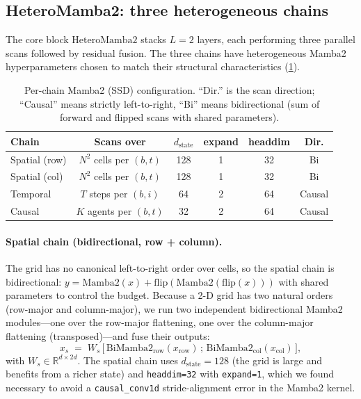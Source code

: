 \subsection{HeteroMamba2: three heterogeneous chains}
\label{sec:hetero}

The core block $\mathrm{HeteroMamba2}$ stacks $L=2$ layers, each performing
three parallel scans followed by residual fusion. The three chains have
heterogeneous Mamba2 hyperparameters chosen to match their structural
characteristics (\cref{tab:chains}).

\begin{table}[h]
\centering
\small
\caption{Per-chain Mamba2 (SSD) configuration. ``Dir.'' is the scan direction;
``Causal'' means strictly left-to-right, ``Bi'' means bidirectional (sum of
forward and flipped scans with shared parameters).}
\label{tab:chains}
\begin{tabular}{lccccc}
\toprule
Chain & Scans over & $d_{\text{state}}$ & expand & headdim & Dir. \\
\midrule
Spatial (row) & $N^2$ cells per $(b,t)$ & 128 & 1 & 32 & Bi \\
Spatial (col) & $N^2$ cells per $(b,t)$ & 128 & 1 & 32 & Bi \\
Temporal      & $T$ steps per $(b,i)$   & 64  & 2 & 64 & Causal \\
Causal        & $K$ agents per $(b,t)$  & 32  & 2 & 64 & Causal \\
\bottomrule
\end{tabular}
\end{table}

\paragraph{Spatial chain (bidirectional, row + column).}
The grid has no canonical left-to-right order over cells, so the spatial chain
is bidirectional: $y = \mathrm{Mamba2}(x) + \mathrm{flip}(\mathrm{Mamba2}(\mathrm{flip}(x)))$
with shared parameters to control the budget. Because a 2-D grid has two natural
orders (row-major and column-major), we run two independent bidirectional
Mamba2 modules---one over the row-major flattening, one over the column-major
flattening (transposed)---and fuse their outputs:
\begin{equation}
x_s \;=\; W_s\,\big[\,\mathrm{BiMamba2}_{\text{row}}(x_{\text{row}})\,;\,
                      \mathrm{BiMamba2}_{\text{col}}(x_{\text{col}})\,\big],
\label{eq:spatial}
\end{equation}
with $W_s\in\mathbb{R}^{d\times 2d}$. The spatial chain uses $d_{\text{state}}{=}128$
(the grid is large and benefits from a richer state) and \texttt{headdim=32} with
\texttt{expand=1}, which we found necessary to avoid a \texttt{causal\_conv1d}
stride-alignment error in the Mamba2 kernel.

